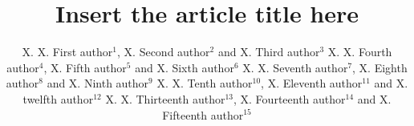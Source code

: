 \documentclass[openacc]{rsproca_new}%
\begin{document}
\title{Insert the article title here}

\author{%
X. X. First author$^{1}$, X. Second author$^{2}$ and X. Third author$^{3}$
X. X. Fourth author$^{4}$, X. Fifth author$^{5}$ and X. Sixth author$^{6}$
X. X. Seventh author$^{7}$, X. Eighth author$^{8}$ and X. Ninth author$^{9}$
X. X. Tenth author$^{10}$, X. Eleventh author$^{11}$ and X. twelfth author$^{12}$
X. X. Thirteenth author$^{13}$, X. Fourteenth author$^{14}$ and X. Fifteenth author$^{15}$}

\address{$^{1}$First author address\\
$^{2}$Second author address\\
$^{3}$Third author address\\
$^{4}$Fourth author address\\
$^{5}$Fifth author address\\
$^{6}$Sixth author address\\
$^{7}$Seventh author address\\
$^{8}$Eighth author address\\
$^{9}$Ninth author address\\
$^{10}$Tenth author address\\
$^{11}$Eleventh author address\\
$^{12}$Twelfth author address\\
$^{13}$Thirteenth author address\\
$^{14}$Fourteenth author address\\
$^{15}$Fifteenth author address}

\subject{xxxxx, xxxxx, xxxx}


\end{document}
